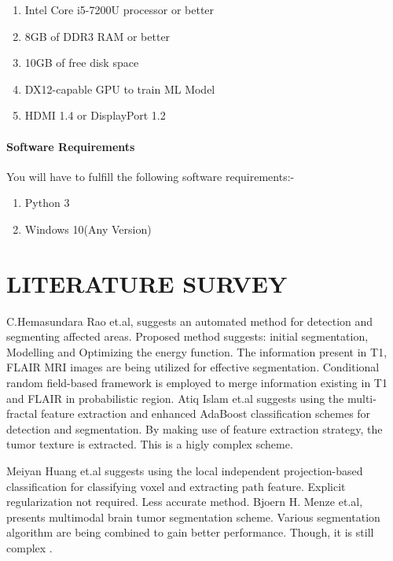 \documentclass[a4paper, 12pt]{report}
\begin{document}
\begin{spacing}{1.5}
\begin{enumerate}
 \item Intel Core i5-7200U processor or better
 \item 8GB of DDR3 RAM or better
 \item 10GB of free disk space
 \item DX12-capable GPU to train ML Model
 \item HDMI 1.4 or DisplayPort 1.2
\end{enumerate}

\subsubsection{Software Requirements}
You will have to fulfill the following software requirements:-
\begin{enumerate}
\item Python 3
\item Windows 10(Any Version)
\end{enumerate}

\newpage
\chapter{LITERATURE SURVEY}

\par C.Hemasundara Rao et.al, suggests an automated method for detection and segmenting affected areas. Proposed method suggests: initial segmentation, Modelling and Optimizing the energy function. The information present in T1, FLAIR MRI images are being utilized for effective segmentation. Conditional random field-based framework is employed to merge information existing in T1 and FLAIR in probabilistic region.\cite{chema} Atiq Islam et.al suggests using the multi-fractal feature extraction and enhanced AdaBoost classification schemes for detection and segmentation. By making use of feature extraction strategy, the tumor texture is extracted. This is a higly complex scheme.\cite{atiq}\\

\par Meiyan Huang et.al suggests using the local independent projection-based classification for classifying voxel and extracting path feature. Explicit regularization not required. Less accurate method\cite{meiy}. Bjoern H. Menze et.al, presents multimodal brain tumor segmentation scheme. Various segmentation algorithm are being combined to gain better performance. Though, it is still complex \cite{bjoe}.\\


\end{spacing}
\end{document}
